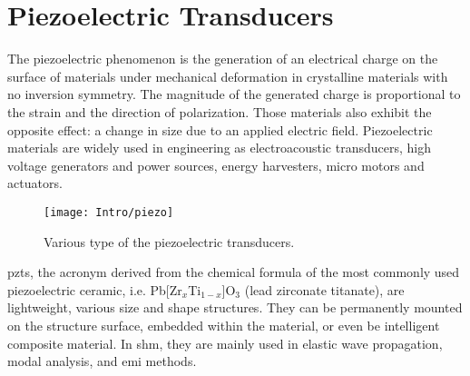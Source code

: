\section{Piezoelectric Transducers}
\label{sec:PZT}

The piezoelectric phenomenon is the generation of an electrical charge on the surface of materials under mechanical deformation in crystalline materials with no inversion symmetry.
The magnitude of the generated charge is proportional to the strain and the direction of polarization.
Those materials also exhibit the opposite effect: a change in size due to an applied electric field.
Piezoelectric materials are widely used in engineering as electroacoustic transducers, high voltage generators and power sources, energy harvesters, micro motors and actuators.
\begin{figure}[H]
	\texttt{[image: Intro/piezo]}
	\caption{Various type of the piezoelectric transducers.}
	\label{fig:piezo}
\end{figure}
\Acp{pzt}, the acronym derived from the chemical formula of the most commonly used piezoelectric ceramic, i.e. Pb[Zr\(_x\)Ti\(_{1-x}\)]O\(_3\) (lead zirconate titanate), are lightweight, various size and shape structures. 
They can be permanently mounted on the structure surface, embedded within the material, or even be intelligent composite material. In \ac{shm}, they are mainly used in elastic wave propagation, modal analysis, and \ac{emi} methods.